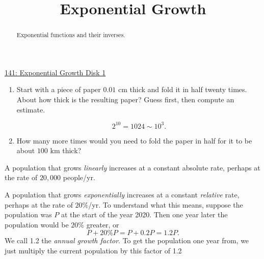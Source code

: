 \documentclass{ximera}
\title{Exponential Growth}
\begin{document}
\begin{abstract}
Exponential functions and their inverses.
\end{abstract}
\maketitle

\begin{exploration}  \label{Edftrg455}

\begin{onlineOnly}
    \begin{center}
\end{center}
\end{onlineOnly}

\href{https://www.desmos.com/calculator/8k0cwumzso}{141: Exponential Growth Disk 1}

\end{exploration}

\begin{example} \label{Ed45345trt65tr5t}
\begin{enumerate}
\item Start with a piece of paper $0.01$ cm thick and fold it in half twenty times. About how thick is the resulting paper? Guess first, then compute an estimate.
\begin{hint}
\[
    2^{10} = 1024 \sim 10^3 .
\]
\end{hint}

\item How many more times would you need to fold the paper in half for it to be about $100$ km thick?
\end{enumerate}
\end{example}


A population that grows \emph{linearly} increases at a constant absolute rate, perhaps at the rate of $20,000$ people/yr. 

A population that grows \emph{exponentially} increases at a constant \emph{relative} rate, perhaps at the rate of $20\%$/yr. To understand what this means, suppose the population was $P$ at the start of the year 2020. Then one year later the population would be $20\%$ greater, or 
\[
   P + 20\% P  = P + 0.2 P = 1.2P .
\]
We call 1.2 the \emph{annual growth factor}. To get the population one year from, we just multiply the current population by this factor of 1.2
\end{document}
